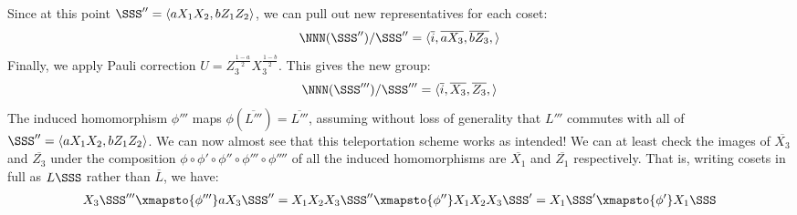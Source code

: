 \begin{example}
    Since at this point $\SSS'' = \langle a X_1 X_2, b Z_1 Z_2 \rangle$, we can pull out new representatives for each coset:
    \begin{equation}
        \NNN(\SSS'')/\SSS'' = \langle
        \overline{i},
        \overline{a X_3}, \overline{b Z_3},
        \rangle
    \end{equation}
    Finally, we apply Pauli correction $U = Z_3^{\frac{1 - a}{2}} X_3^{\frac{1 - b}{2}}$.
    This gives the new group:
    \begin{equation}
        \NNN(\SSS''')/\SSS''' = \langle
        \overline{i},
        \overline{X_3}, \overline{Z_3},
        \rangle
    \end{equation}
    The induced homomorphism $\phi'''$ maps $\phi(\overline{L'''}) = \overline{L'''}$, assuming without loss of generality that $L'''$ commutes with all of $\SSS'' = \langle a X_1 X_2, b Z_1 Z_2 \rangle$.
    We can now almost see that this teleportation scheme works as intended!
    We can at least check the images of $\overline{X_3}$ and $\overline{Z_3}$ under the composition $\phi \circ \phi' \circ \phi'' \circ \phi''' \circ \phi''''$ of all the induced homomorphisms are $\overline{X_1}$ and $\overline{Z_1}$ respectively.
    That is, writing cosets in full as $L\SSS$ rather than $\overline{L}$, we have:
    \begin{align}
        X_3\SSS'''
        &\xmapsto{\phi'''} a X_3\SSS'' = X_1 X_2 X_3 \SSS''
        \xmapsto{\phi''} X_1 X_2 X_3 \SSS' = X_1 \SSS'
        \xmapsto{\phi'} X_1\SSS \\

\end{align}
\end{example}

